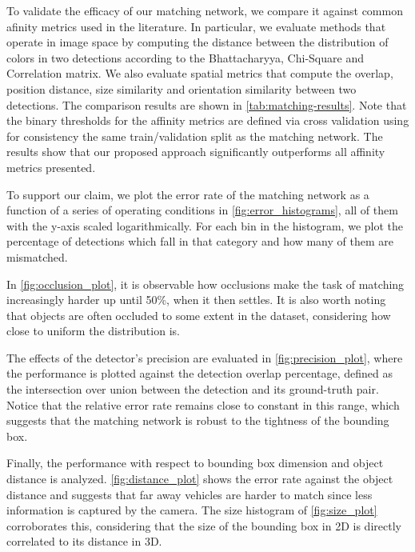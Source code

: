 \documentclass[letterpaper, 10 pt, conference]{ieeeconf}  \pdfminorversion=4
\newcommand{\raquel}[1]{}
\begin{document}
\vspace{0.1cm}
To validate the efficacy of our matching network, we compare it against common afinity metrics used in the literature. In particular, we evaluate methods that operate in image space by computing the distance between the distribution of colors in two detections according to the Bhattacharyya, Chi-Square and Correlation matrix. We also evaluate spatial metrics that compute the overlap, position distance, size similarity and orientation similarity between two detections.
The comparison results are shown in \autoref{tab:matching-results}. Note that the binary thresholds for the affinity metrics are defined via cross validation using for consistency the same train/validation split as the matching network. The results show that our proposed approach significantly outperforms all affinity metrics presented. \raquel{you need to explain what these baselines are!}


\vspace{0.1cm}
To support our claim, we plot the error rate of the matching network as a function of a series of operating conditions in \autoref{fig:error_histograms}, all of them with the y-axis scaled logarithmically. For each bin in the histogram, we plot the percentage of detections which fall in that category and how many of them are mismatched.

\raquel{Is this error analyis wrt detector? I thougth this was the tracker...}

In \autoref{fig:occlusion_plot}, it is observable how occlusions make the task of matching increasingly harder up until 50\%, when it then settles. It is also worth noting that objects are often occluded to some extent in the dataset, considering how close to uniform the distribution is.

The effects of the detector's precision are evaluated in \autoref{fig:precision_plot}, where the performance is plotted against the detection overlap percentage, defined as the intersection over union between the detection and its ground-truth pair. Notice that the relative error rate remains close to constant in this range, which suggests that the matching network is robust to the tightness of the bounding box.

Finally, the performance with respect to bounding box dimension and object distance is analyzed. \autoref{fig:distance_plot} shows the error rate against the object distance and suggests that far away vehicles are harder to match since less information is captured by the camera. The size histogram of \autoref{fig:size_plot} corroborates this, considering that the size of the bounding box in 2D is directly correlated to its distance in 3D.
\end{document}
